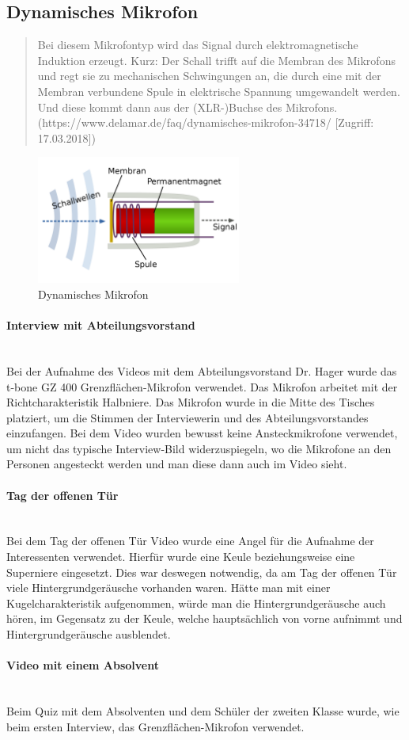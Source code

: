 \subsection{Dynamisches Mikrofon}
\begin{quote}
Bei diesem Mikrofontyp wird das Signal durch elektromagnetische Induktion erzeugt. Kurz: Der Schall trifft auf die Membran des Mikrofons und regt sie zu mechanischen Schwingungen an, die durch eine mit der Membran verbundene Spule in elektrische Spannung umgewandelt werden. Und diese kommt dann aus der (XLR-)Buchse des Mikrofons. (https://www.delamar.de/faq/dynamisches-mikrofon-34718/ [Zugriff: 17.03.2018])
\end{quote} 
\begin{figure}[H]
	\centering
	\includegraphics[width=0.6\textwidth]{abb9} 
	\caption[Dynamisches Mikrofon]{Dynamisches Mikrofon\footnotemark}
\end{figure}
\paragraph{Interview mit Abteilungsvorstand}
\leavevmode \\
Bei der Aufnahme des Videos mit dem Abteilungsvorstand Dr. Hager wurde das t-bone GZ 400 Grenzflächen-Mikrofon verwendet. Das Mikrofon arbeitet mit der Richtcharakteristik Halbniere. Das Mikrofon wurde in die Mitte des Tisches platziert, um die Stimmen der Interviewerin und des Abteilungsvorstandes einzufangen.\newline
Bei dem Video wurden bewusst keine Ansteckmikrofone verwendet, um nicht das typische Interview-Bild widerzuspiegeln, wo die Mikrofone an den Personen angesteckt werden und man diese dann auch im Video sieht.
\paragraph{Tag der offenen Tür}
\leavevmode \\
Bei dem Tag der offenen Tür Video wurde eine Angel für die Aufnahme der Interessenten verwendet. Hierfür wurde eine Keule beziehungsweise eine Superniere eingesetzt. Dies war deswegen notwendig, da am Tag der offenen Tür viele Hintergrundgeräusche vorhanden waren. Hätte man mit einer Kugelcharakteristik aufgenommen, würde man die Hintergrundgeräusche auch hören, im Gegensatz zu der Keule, welche hauptsächlich von vorne aufnimmt und Hintergrundgeräusche ausblendet.
\paragraph{Video mit einem Absolvent}
\leavevmode \\
Beim Quiz mit dem Absolventen und dem Schüler der zweiten Klasse wurde, wie beim ersten Interview, das Grenzflächen-Mikrofon verwendet.